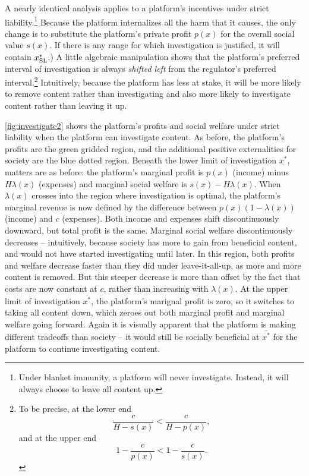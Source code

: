 A nearly identical analysis applies to a platform's incentives under strict liability.\footnote{Under blanket immunity, a platform will never investigate. Instead, it will always choose to leave all content up.} Because the platform internalizes all the harm that it causes, the only change is to substitute the platform's private profit $p(x)$ for the overall social value $s(x)$. If there is any range for which investigation is justified, it will contain  $x_{\text{SL}}^*$.) %
A little algebraic manipulation shows that the platform's preferred interval of investigation is always \emph{shifted left} from the regulator's preferred interval.\footnote{To be precise, at the lower end \begin{equation*}\frac{c}{H - s(x)} < \frac{c}{H - p(x)},\end{equation*} and at the upper end \begin{equation*}1 - \frac{c}{p(x)} < 1 - \frac{c}{s(x)}.\end{equation*}} Intuitively, because the platform has less at stake, it will be more likely to remove content rather than investigating and also more likely to investigate content rather than leaving it up.




\autoref{fig:investigate2} shows the platform's profits and social welfare under strict liability when the platform can investigate content. As before, the platform's profits are the green gridded region, and the additional positive externalities for society are the blue dotted region. Beneath the lower limit of investigation $\underline{x^*}$, matters are as before: the platform's marginal profit is $p(x)$ (income) minus $H\lambda(x)$ (expenses) and marginal social welfare is $s(x) - H\lambda(x)$. When $\lambda(x)$ crosses into the region where investigation is optimal, the platform's marginal revenue is now defined by the difference between $p(x)(1 - \lambda(x))$ (income) and $c$ (expenses). Both income and expenses shift discontinuously downward, but total profit is the same. Marginal social welfare discontinuously decreases -- intuitively, because society has more to gain from beneficial content, and would not have started investigating until later. In this region, both profits and welfare decrease faster than they did under leave-it-all-up, as more and more content is removed. But this steeper decrease is more than offset by the fact that costs are now constant at $c$, rather than increasing with $\lambda(x)$. At the upper limit of investigation $\overline{x^*}$, the platform's marignal profit is zero, so it switches to taking all content down, which zeroes out both marginal profit and marginal welfare going forward. Again it is visually apparent that the platform is making different tradeoffs than society -- it would still be socially beneficial at $\overline{x^*}$ for the platform to continue investigating content.





